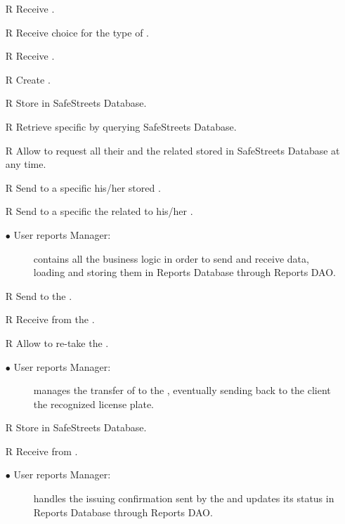 \documentclass[../DD.tex]{subfiles}
\begin{document}
\begin{itemize}
	\item[R\subs{4}]Receive .
	\item[R\subs{5}]Receive  choice for the type of .
	\item[R\subs{6}]Receive .
	\item[R\subs{9}]Create .
	\item[R\subs{10}]Store  in SafeStreets Database.
	\item[R\subs{14}]Retrieve specific  by querying SafeStreets Database.
	\item[R\subs{20}]Allow  to request all their  and the related  stored in SafeStreets Database at any time.
	\item[R\subs{21}]Send to a specific  his/her stored .
	\item[R\subs{22}]Send to a specific  the  related to his/her .
	\begin{description}
	\item[$\bullet$ User reports Manager:] contains all the business logic in order to send and receive  data, loading and storing them in Reports Database through Reports DAO.
	\end{description}

	\item[R\subs{7}]Send  to the .
	\item[R\subs{8}]Receive  from the .
	\item[R\subs{26}]Allow  to re-take the .
	\begin{description}
	\item[$\bullet$ User reports Manager:] manages the transfer of  to the , eventually sending back to the client the recognized license plate.
	\end{description}

	\item[R\subs{12}]Store  in SafeStreets Database.
	\item[R\subs{25}]Receive  from .	
	\begin{description}
	\item[$\bullet$ User reports Manager:] handles the  issuing confirmation sent by the  and updates its status in Reports Database through Reports DAO.
	\end{description}


\end{itemize}
\end{document}
